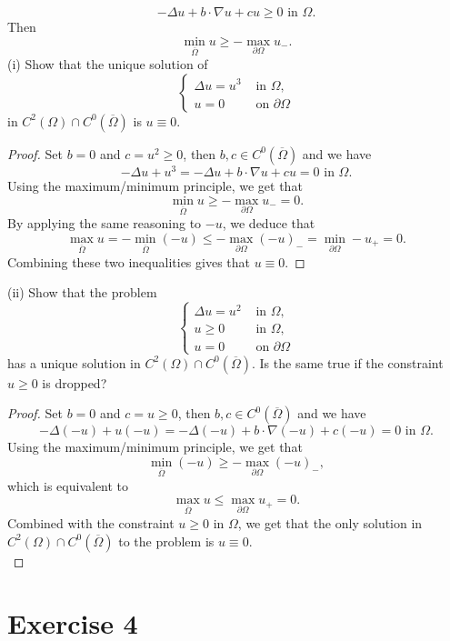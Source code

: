 \documentclass{article}
\begin{document}
\[
-\Delta u+b\cdot\nabla u+cu\geqslant 0 \text{ in }\Omega.
\]
Then 
\[
\min_{\overline{\Omega}}u\geqslant -\max_{\partial\Omega}u_-.
\]
(i) Show that the unique solution of 
\[
\begin{cases}
    \Delta u=u^3 &\text{ in }\Omega,\\
    u=0 &\text{ on }\partial\Omega
\end{cases}
\]
in $C^2(\Omega)\cap C^0(\overline{\Omega})$ is $u\equiv 0$.
\begin{proof}
    Set $b=0$ and $c=u^2\geqslant 0$, then $b,c\in C^0(\overline{\Omega})$ and we have
    \[
    -\Delta u+u^3=-\Delta u+b\cdot \nabla u+cu=0 \text{ in }\Omega.
    \]
    Using the maximum/minimum principle, we get that 
    \[
    \min_{\overline{\Omega}}u\geqslant-\max_{\partial\Omega}u_-=0.
    \]
    By applying the same reasoning to $-u$, we deduce that
    \[
    \max_{\overline{\Omega}}u=-\min_{\overline{\Omega}}(-u)\leqslant -\max_{\partial\Omega}(-u)_-=\min_{\partial\Omega}-u_+=0.
    \]
    Combining these two inequalities gives that $u\equiv 0$.
\end{proof}
(ii) Show that the problem
\[
\begin{cases}
    \Delta u=u^2&\text{ in }\Omega,\\
    u\geqslant 0 &\text{ in }\Omega,\\
    u=0&\text{ on }\partial\Omega
\end{cases}
\]
has a unique solution in $C^2(\Omega)\cap C^0(\overline{\Omega})$. Is the same true if the constraint $u\geqslant 0$ is dropped?
\begin{proof}
    Set $b=0$ and $c=u\geqslant 0$, then $b,c\in C^0(\overline{\Omega})$ and we have
    \[
    -\Delta(-u)+u(-u)=-\Delta(-u) +b\cdot\nabla(-u)+c(-u)=0\text{ in }\Omega.
    \]
    Using the maximum/minimum principle, we get that 
    \[
    \min_{\overline{\Omega}}(-u)\geqslant-\max_{\partial \Omega}(-u)_-,
    \]
    which is equivalent to
    \[
    \max_{\overline{\Omega}} u\leqslant \max_{\partial\Omega}u_+=0.
    \]
    Combined with the constraint $u\geqslant 0$ in $\Omega$, we get that the only solution in $C^2(\Omega)\cap C^0(\overline{\Omega})$ to the problem is $u\equiv 0$.\\
   
\end{proof}

\section*{Exercise 4}
\end{document}
